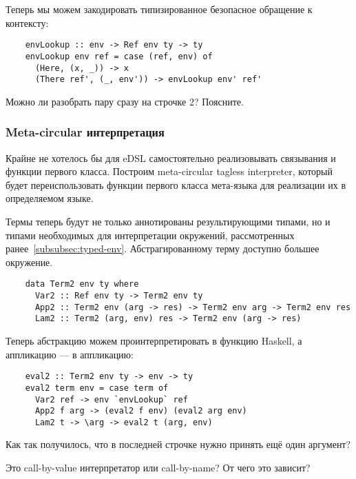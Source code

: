 Теперь мы можем закодировать типизированное безопасное обращение к контексту:
\begin{verbatim}
    envLookup :: env -> Ref env ty -> ty
    envLookup env ref = case (ref, env) of
      (Here, (x, _)) -> x
      (There ref', (_, env')) -> envLookup env' ref'
\end{verbatim}

\begin{task}
    Можно ли разобрать пару сразу на строчке 2?
    Поясните.
\end{task}

\subsubsection{Meta-circular интерпретация}

Крайне не хотелось бы для eDSL самостоятельно реализовывать связывания и функции первого класса.
Построим meta-circular tagless interpreter, который будет переиспользовать функции первого класса мета-языка для реализации их в определяемом языке.

Термы теперь будут не только аннотированы результирующими типами, но и типами необходимых для интерпретации окружений, рассмотренных ранее~\ref{subsubsec:typed-env}.
Абстрагированному терму доступно большее окружение.

\begin{verbatim}
    data Term2 env ty where
      Var2 :: Ref env ty -> Term2 env ty
      App2 :: Term2 env (arg -> res) -> Term2 env arg -> Term2 env res
      Lam2 :: Term2 (arg, env) res -> Term2 env (arg -> res)
\end{verbatim}

Теперь абстракцию можем проинтерпретировать в функцию Haskell, а аппликацию --- в аппликацию:
\begin{verbatim}
    eval2 :: Term2 env ty -> env -> ty
    eval2 term env = case term of
      Var2 ref -> env `envLookup` ref
      App2 f arg -> (eval2 f env) (eval2 arg env)
      Lam2 t -> \arg -> eval2 t (arg, env)
\end{verbatim}

\begin{task}
    Как так получилось, что в последней строчке нужно принять ещё один аргумент?
\end{task}

\begin{task}
    Это call-by-value интерпретатор или call-by-name?
    От чего это зависит?
\end{task}

